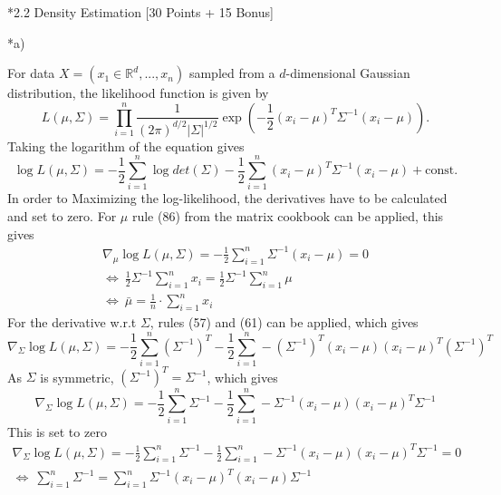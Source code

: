 \documentclass[12pt]{article}
\newcommand{\R}{\mathbb{R}}
\begin{document}
\begin{section}*{2.2 Density Estimation [30 Points + 15 Bonus]}
	\begin{subsection}*{a)}
		
		
		
		For data $X=(x_1 \in \R^{d},...,x_n)$ sampled from a $d$-dimensional Gaussian distribution, the likelihood function is given by
		\begin{equation*}
		L(\mu,\Sigma) = \prod_{i=1}^n \frac{1}{(2\pi)^{d/2}|\Sigma|^{1/2}}\exp(-\frac{1}{2}(x_i-\mu)^T\Sigma^{-1}(x_i-\mu)).
		\end{equation*}
		Taking the logarithm of the equation gives
		\begin{equation*}
		\log L(\mu,\Sigma) = -\frac{1}{2}\sum_{i=1}^n\log det(\Sigma)-\frac{1}{2}\sum_{i=1}^n (x_i-\mu)^T\Sigma^{-1}(x_i-\mu)+\text{const}.
		\end{equation*}
		In order to Maximizing the log-likelihood, the derivatives have to be calculated and set to zero.
		For $\mu$ rule (86) from the matrix cookbook can be applied, this gives
		\begin{gather*}
		\nabla_\mu 	\log L(\mu,\Sigma) = - \frac{1}{2} \sum_{i=1}^n \Sigma^{-1}(x_i - \mu) = 0\\
		\Leftrightarrow~ \frac{1}{2}\Sigma^{-1}\sum_{i=1}^n x_i =\frac{1}{2}\Sigma^{-1}\sum_{i=1}^n \mu\\
		\Leftrightarrow~\bar{\mu} = \frac{1}{n}\cdot\sum_{i=1}^n x_i
		\end{gather*}
		For the derivative w.r.t $\Sigma$, rules (57) and (61) can be applied, which gives
		\begin{equation*}
		\nabla_\Sigma 	\log L(\mu,\Sigma) = -\frac{1}{2}\sum_{i=1}^n(\Sigma^{-1})^T - \frac{1}{2}\sum_{i=1}^n -(\Sigma^{-1})^T(x_i-\mu)(x_i-\mu)^T(\Sigma^{-1})^T
		\end{equation*}
		As $\Sigma$ is symmetric, $(\Sigma^{-1})^T = \Sigma^{-1}$, which gives
		\begin{equation*}
		\nabla_\Sigma 	\log L(\mu,\Sigma) = -\frac{1}{2}\sum_{i=1}^n\Sigma^{-1} - \frac{1}{2}\sum_{i=1}^n -\Sigma^{-1}(x_i-\mu)(x_i-\mu)^T\Sigma^{-1}
		\end{equation*}
		This is set to zero
		\begin{gather*}
		\nabla_\Sigma 	\log L(\mu,\Sigma) = -\frac{1}{2}\sum_{i=1}^n\Sigma^{-1} - \frac{1}{2}\sum_{i=1}^n -\Sigma^{-1}(x_i-\mu)(x_i-\mu)^T\Sigma^{-1} = 0\\
		\Leftrightarrow~ \sum_{i=1}^n\Sigma^{-1} = \sum_{i=1}^n \Sigma^{-1}(x_i-\mu)^T(x_i-\mu)\Sigma^{-1}\\

\end{gather*}
\end{subsection}
\end{section}
\end{document}
